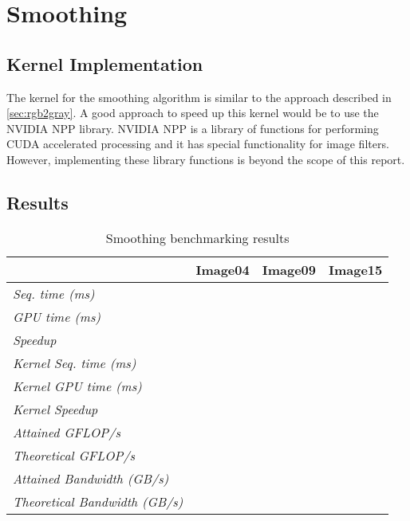 \documentclass[final]{report}
\begin{document}
\chapter{Smoothing}

\section{Kernel Implementation}
The kernel for the smoothing algorithm is similar to the approach described in \cref{sec:rgb2gray}.
A good approach to speed up this kernel would be to use the NVIDIA NPP library.
NVIDIA NPP is a library of functions for performing CUDA accelerated processing and it has special functionality for image filters.
However, implementing these library functions is beyond the scope of this report.

\section{Results}
\begin{table}[H]
	\centering
	\caption{Smoothing benchmarking results}
	\label{tab:smoothing-results}
	\begin{tabular}{llll}
	\toprule
											& \textbf{Image04} 	& \textbf{Image09} & \textbf{Image15} \\
	\midrule
	\textit{Seq. time (ms)} 				& ~ 				& ~ 				& ~ \\
	\textit{GPU time (ms)} 					& ~ 				& ~ 				& ~ \\
	\textit{Speedup} 						& ~ 				& ~ 				& ~ \\
	\midrule
	\textit{Kernel Seq. time (ms)} 			& ~ 				& ~ 				& ~ \\
	\textit{Kernel GPU time (ms)} 			& ~ 				& ~ 				& ~ \\
	\textit{Kernel Speedup} 				& ~ 				& ~ 				& ~ \\
	\midrule
	\textit{Attained GFLOP/s} 				& ~ 				& ~ 				& ~ \\
	\textit{Theoretical GFLOP/s} 			& ~ 				& ~ 				& ~ \\
	\textit{Attained Bandwidth (GB/s)}		& ~ 				& ~ 				& ~ \\
	\textit{Theoretical Bandwidth (GB/s)}	& ~ 				& ~ 				& ~ \\
	\bottomrule
	\end{tabular}
\end{table}

\end{document}
